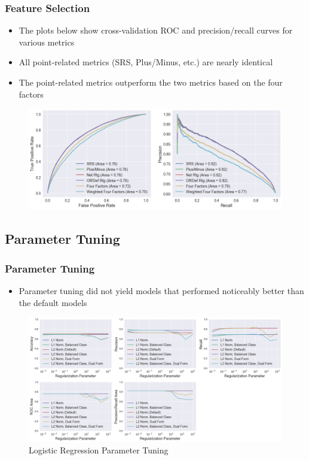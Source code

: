 \documentclass{beamer}
\begin{document}
\begin{frame}
\frametitle{Feature Selection}
\begin{itemize}
    \item The plots below show cross-validation ROC and precision/recall curves for various metrics
    \item All point-related metrics (SRS, Plus/Minus, etc.) are nearly identical
    \item The point-related metrics outperform the two metrics based on the four factors
\end{itemize}
\begin{figure}
\includegraphics[scale=0.35]{../docs/assets/images/feature-selection/cross-validation-comparison.png}
\end{figure}
\end{frame}

\subsection{Parameter Tuning}
\begin{frame}
\frametitle{Parameter Tuning}
\begin{itemize}
    \item Parameter tuning did not yield models that performed noticeably better than the default models
\end{itemize}
\begin{figure}
\includegraphics[scale=0.3]{../docs/assets/images/parameter-tuning/logistic-regression-metrics.png}
\caption{Logistic Regression Parameter Tuning}
\end{figure}
\end{frame}
\end{document}
